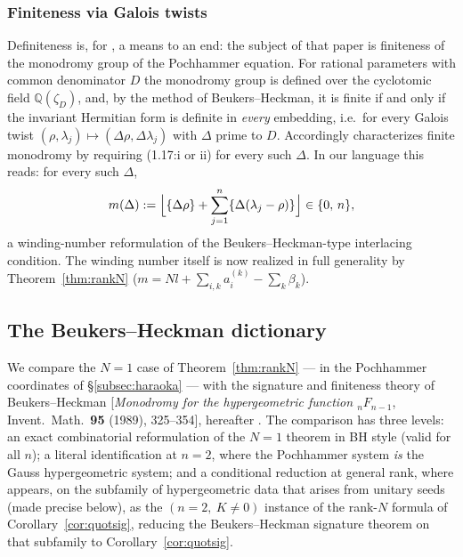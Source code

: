 \documentclass[11pt]{article}
\theoremstyle{definition}
\newcommand{\frc}[1]{\{#1\}}
\begin{document}
\subsubsection*{Finiteness via Galois twists}
Definiteness is, for \cite{Haraoka1994}, a means to an end: the subject of that
paper is finiteness of the monodromy group of the Pochhammer
equation. For rational parameters with common denominator $D$ the
monodromy group is defined over the cyclotomic field
$\mathbb Q(\zeta_D)$, and, by the method of Beukers--Heckman, it is finite
if and only if the invariant Hermitian form is definite in
\emph{every} embedding, i.e.\ for every Galois twist
$(\rho,\lambda_j)\mapsto(\Delta\rho,\Delta\lambda_j)$ with
$\Delta$ prime to $D$. Accordingly \cite[Theorem~1.2]{Haraoka1994} characterizes
finite monodromy by requiring (1.17:i or ii) for every such $\Delta$.
In our language this reads: for every such $\Delta$,
\[
m(\Delta):=\Bigl\lfloor \frc{\Delta\rho}
+\sum_{j=1}^n\frc{\Delta(\lambda_j-\rho)}\Bigr\rfloor\in\{0,\,n\},
\]
a winding-number reformulation of the Beukers--Heckman-type interlacing
condition. The winding number itself is now realized in full generality
by Theorem~\ref{thm:rankN} ($m=Nl+\sum_{i,k}a_i^{(k)}-\sum_k\beta_k$).

\subsection{The Beukers--Heckman dictionary}\label{subsec:bh}

We compare the $N=1$ case of Theorem~\ref{thm:rankN} --- in the Pochhammer coordinates of \S\ref{subsec:haraoka} --- with the signature and finiteness theory of
Beukers--Heckman [\emph{Monodromy for the hypergeometric function
${}_nF_{n-1}$}, Invent.\ Math.\ \textbf{95} (1989), 325--354], hereafter
\cite{BH}. The comparison has three levels: an exact combinatorial reformulation of the $N=1$ theorem in BH style (valid for all $n$); a literal
identification at $n=2$, where the Pochhammer system \emph{is} the Gauss
hypergeometric system; and a conditional reduction at general rank, where
\cite[Theorem~4.5]{BH} appears, on the subfamily of hypergeometric data
that arises from unitary seeds (made precise below), as the
$(n=2,\ K\neq0)$ instance of the rank-$N$ formula of
Corollary~\ref{cor:quotsig}, reducing the Beukers--Heckman signature
theorem on that subfamily to Corollary~\ref{cor:quotsig}.
\end{document}
